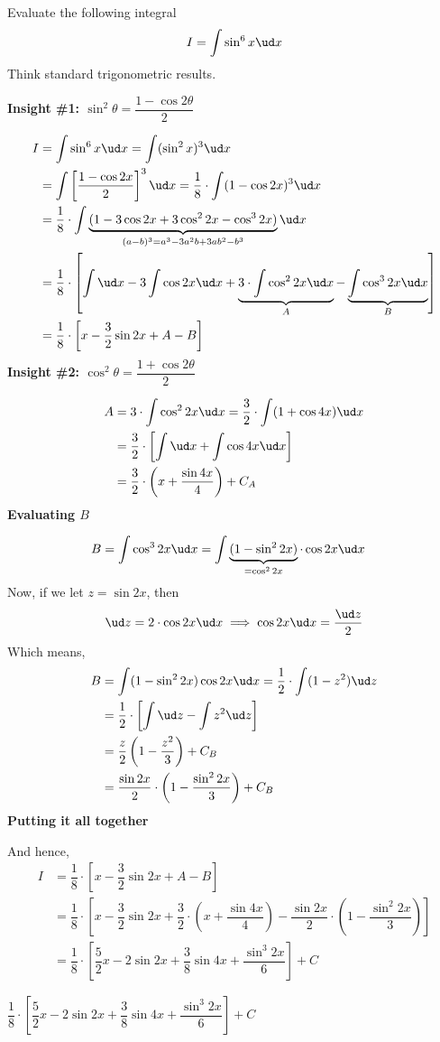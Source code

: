 
\question[5] Evaluate the following integral 
\[ I = \int\sin^6 x\ud x \]
Think standard trigonometric results.

\begin{solution}[\fullpage]
  \textbf{Insight \#1: $\sin^2\theta = \dfrac{1-\cos 2\theta}{2}$}
  
  \begin{align}
    I &= \int\sin^6 x\ud x = \int(\sin^2 x)^3\ud x \\
    &= \int\left[\dfrac{1-\cos 2x}{2} \right]^3\ud x = \dfrac{1}{8}\cdot\int (1-\cos 2x)^3\ud x \\
    &= \dfrac{1}{8}\cdot\int\underbrace{(1-3\cos 2x + 3\cos^2 2x - \cos^3 2x)}_{(a-b)^3 = a^3 - 3a^2b + 3ab^2 - b^3}\ud x \\
    &= \dfrac{1}{8}\cdot\left[\int\ud x - 3\int\cos 2x\ud x + \underbrace{3\cdot\int\cos^2 2x\ud x}_{A} - \underbrace{\int\cos^3 2x\ud x}_{B} \right] \\
    &= \dfrac{1}{8}\cdot\left[ x -\dfrac{3}{2}\sin 2x + A - B \right]
  \end{align}
  \textbf{Insight \#2: $\cos^2\theta = \dfrac{1+\cos 2\theta}{2}$}

  \begin{align}
    A &= 3\cdot\int\cos^2 2x\ud x = \dfrac{3}{2}\cdot\int(1+\cos 4x)\ud x \\
      &= \dfrac{3}{2}\cdot\left[ \int\ud x + \int\cos 4x\ud x \right] \\
      &= \dfrac{3}{2}\cdot\left( x + \dfrac{\sin 4x}{4} \right) + C_A
  \end{align} 
  \textbf{Evaluating $B$}

  \begin{align}
    B &= \int\cos^3 2x\ud x = \int\underbrace{(1-\sin^2 2x)}_{=\cos^2 2x}\cdot\cos 2x\ud x
  \end{align}
  Now, if we let $z = \sin 2x$, then 
  \[ \ud z = 2\cdot\cos 2x\ud x \implies \cos 2x\ud x = \dfrac{\ud z}{2} \]
  Which means, 
  \begin{align}
    B &= \int(1-\sin^2 2x)\cos 2x\ud x = \dfrac{1}{2}\cdot\int (1-z^2)\ud z \\
     &= \dfrac{1}{2}\cdot\left[ \int\ud z - \int z^2\ud z \right] \\
     & = \dfrac{z}{2}\left( 1 - \dfrac{z^2}{3} \right) + C_B \\
     & = \dfrac{\sin 2x}{2}\cdot\left( 1-\dfrac{\sin^2 2x}{3}\right) + C_B 
  \end{align}
  \textbf{Putting it all together}

  And hence, 
  \begin{align}
    I &= \dfrac{1}{8}\cdot\left[ x -\dfrac{3}{2}\sin 2x + A - B \right] \\
      &= \dfrac{1}{8}\cdot\left[ x - \dfrac{3}{2}\sin 2x + 
         \dfrac{3}{2}\cdot\left( x + \dfrac{\sin 4x}{4} \right) - 
         \dfrac{\sin 2x}{2}\cdot\left( 1-\dfrac{\sin^2 2x}{3}\right)\right] \\
      &= \dfrac{1}{8}\cdot\left[\dfrac{5}{2}x - 2\sin 2x + \dfrac{3}{8}\sin 4x + \dfrac{\sin^3 2x}{6} \right] + C 
  \end{align}
\end{solution}

\ifprintanswers
  \begin{codex}
    $\dfrac{1}{8}\cdot\left[\dfrac{5}{2}x - 2\sin 2x + \dfrac{3}{8}\sin 4x + \dfrac{\sin^3 2x}{6} \right] + C$
  \end{codex}
\fi
